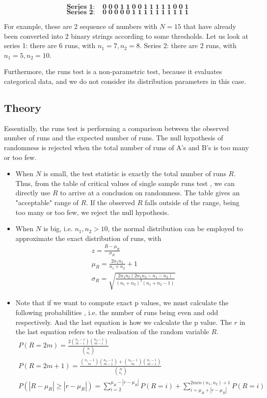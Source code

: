 \documentclass[12pt]{article}
\theoremstyle{plain}
\theoremstyle{definition}
\theoremstyle{remark}
\begin{document}
\[\mathbf{\textbf{Series 1:}\;\;\;\;0\;0\;0\;1\;1\;0\;0\;1\;1\;1\;1\;1\;0\;0\;1}\]
\[\mathbf{\textbf{Series 2:}\;\;\;\;0\;0\;0\;0\;0\;1\;1\;1\;1\;1\;1\;1\;1\;1\;1}\]

For example, these are 2 sequence of numbers with $N=15$ that have already been converted into 2 binary strings according to some thresholds. Let us look at series 1: there are 6 runs, with $n_1=7,n_2=8$. Series 2: there are 2 runs, with $n_1=5,n_2=10$.

Furthermore, the runs test is a non-parametric test, because it evaluates categorical data, and we do not consider its distribution parameters in this case.

\newpage
\subsection{Theory}
Essentially, the runs test is performing a comparison between the observed number of runs and the expected number of runs. The null hypothesis of randomness is rejected when the total number of runs of A’s and B’s is too many or too few. 

\begin{itemize}
    \item When $N$ is small, the test statistic is exactly the total number of runs $R$. Thus, from the table of critical values of single sample runs test \cite[Table~A8]{3.4}, we can directly use $R$ to arrive at a conclusion on randomness. The table gives an "acceptable" range of $R$. If the observed $R$ falls outside of the range, being too many or too few, we reject the null hypothesis.
    \item When $N$ is big, i.e. $n_1,n_2>10$, the normal distribution can be employed to approximate the exact
    distribution of runs\cite{3.4}\cite{3.1}\cite{3.3}, with
    \begin{gather*}
      z=\frac{R-\mu_R}{\sigma_R}\\
      \mu_R=\frac{2n_1n_2}{n_1+n_2}+1\\
      \sigma_R=\sqrt{\frac{2n_1n_2(2n_1n_2-n_1-n_2)}{(n_1+n_2)^2(n_1+n_2-1)}}
    \end{gather*}
    \item Note that if we want to compute exact p values, we must calculate the following probabilities \cite{3.3}\cite{3.6}, i.e. the number of runs being even and odd respectively. And the last equation is how we calculate the p value. The $r$ in the last equation refers to the realisation of the random variable $R$.
    \begin{gather}
      P(R=2m)=\frac{2\binom{n_1-1}{m-1}\binom{n_2-1}{m-1}}{\binom{N}{n_1}}\\
      P(R=2m+1)=\frac{\binom{n_1-1
      }{m}\binom{n_2-1}{m-1}+\binom{n_2-1}{m} \binom{n_1-1}{m-1}}{\binom{N}{n_1}}\\
      P(|R-\mu_R|\ge|r-\mu_R|)=\sum_{i=2}^{\mu_R-|r-\mu_R|}P(R=i)+\sum_{i=\mu_R+|r-\mu_R|}^{2min(n_1,n_2)+1}P(R=i)
    \end{gather}
\end{itemize}
\end{document}
